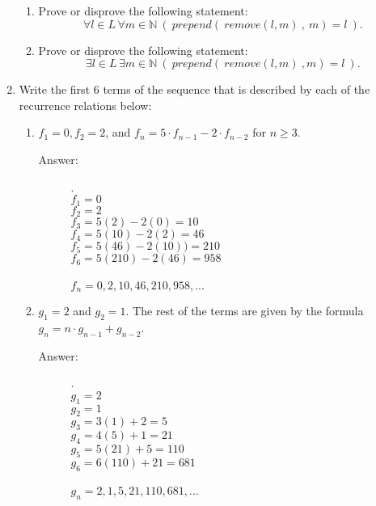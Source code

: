 \documentclass[12pt, oneside]{article}
\begin{document}
\begin{enumerate}
\begin{enumerate}
\item Prove or disprove the following statement: 
$$\forall l \in L \, \forall m \in \mathbb{N}~(~prepend(~remove(l,m)~,~m) = l~).$$
\item Prove or disprove the following statement: 
$$\exists l \in L \, \exists m \in \mathbb{N}~(~prepend(~remove(l,m)~,m) = l~).$$
\end{enumerate}

\item Write the first 6 terms of the sequence that is described by each of the recurrence relations below:

\begin{enumerate}
    \item $f_1 = 0, f_2 = 2$, and $f_n = 5·f_{n-1} - 2·f_{n-2}$ for $n \geq 3$.
    
    \begin{description}
        \item[Answer:] .\\
            $f_1 = 0$\\
            $f_2 = 2$\\
            $f_3 = 5(2) - 2(0) = 10$\\
            $f_4 = 5(10) - 2(2) = 46$\\
            $f_5 = 5(46) - 2(10)) = 210$\\
            $f_6 = 5(210) - 2(46) = 958$\\\\
            $f_n = 0, 2, 10, 46, 210, 958,...$
    \end{description}
    
    \item $g_1 = 2$ and $g_2 = 1$. The rest of the terms are given by the formula $g_n = n·g_{n-1} + g_{n-2}$.

    \begin{description}
        \item[Answer:] .\\
            $g_1 = 2$\\
            $g_2 = 1$\\
            $g_3 = 3(1) + 2 = 5$\\
            $g_4 = 4(5) + 1 = 21$\\
            $g_5 = 5(21) + 5 = 110$\\
            $g_6 = 6(110) + 21 = 681$\\\\
            $g_n = 2, 1, 5, 21, 110, 681,...$
    \end{description}


\end{enumerate}
\end{enumerate}
\end{document}
